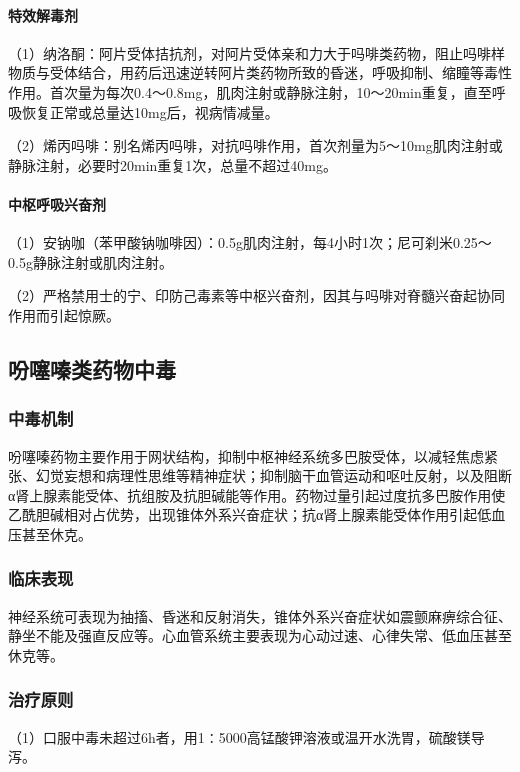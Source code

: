 \paragraph{特效解毒剂}

（1）纳洛酮：阿片受体拮抗剂，对阿片受体亲和力大于吗啡类药物，阻止吗啡样物质与受体结合，用药后迅速逆转阿片类药物所致的昏迷，呼吸抑制、缩瞳等毒性作用。首次量为每次0.4～0.8mg，肌肉注射或静脉注射，10～20min重复，直至呼吸恢复正常或总量达10mg后，视病情减量。

（2）烯丙吗啡：别名烯丙吗啡，对抗吗啡作用，首次剂量为5～10mg肌肉注射或静脉注射，必要时20min重复1次，总量不超过40mg。
\paragraph{中枢呼吸兴奋剂}

（1）安钠咖（苯甲酸钠咖啡因）：0.5g肌肉注射，每4小时1次；尼可刹米0.25～0.5g静脉注射或肌肉注射。

（2）严格禁用士的宁、印防己毒素等中枢兴奋剂，因其与吗啡对脊髓兴奋起协同作用而引起惊厥。

\subsection{吩噻嗪类药物中毒}

\subsubsection{中毒机制}

吩噻嗪药物主要作用于网状结构，抑制中枢神经系统多巴胺受体，以减轻焦虑紧张、幻觉妄想和病理性思维等精神症状；抑制脑干血管运动和呕吐反射，以及阻断α肾上腺素能受体、抗组胺及抗胆碱能等作用。药物过量引起过度抗多巴胺作用使乙酰胆碱相对占优势，出现锥体外系兴奋症状；抗α肾上腺素能受体作用引起低血压甚至休克。

\subsubsection{临床表现}

神经系统可表现为抽搐、昏迷和反射消失，锥体外系兴奋症状如震颤麻痹综合征、静坐不能及强直反应等。心血管系统主要表现为心动过速、心律失常、低血压甚至休克等。

\subsubsection{治疗原则}

（1）口服中毒未超过6h者，用1∶5000高锰酸钾溶液或温开水洗胃，硫酸镁导泻。

